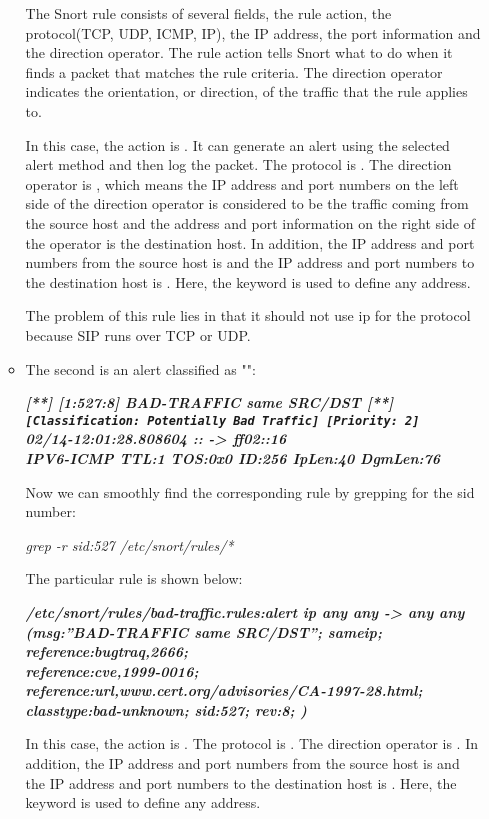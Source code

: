 \begin{enumerate}
\begin{itemize}
The Snort rule consists of several fields, the rule action, the protocol(TCP, UDP, ICMP, IP), the IP address, the port information and the direction operator. The rule action tells Snort what to do when it finds a packet that matches the rule criteria. The direction operator indicates the orientation, or direction, of the traffic that the rule applies to.

In this case, the action is . It can generate an alert using the selected alert method and then log the packet. The protocol is .  The direction operator is  \exploitname{->}, which means the IP address and port numbers on the left side of the direction operator is considered to be the traffic coming from the source host and the address and port information on the right side of the operator is the destination host. In addition, the IP address and port numbers from the source host is  and the IP address and port numbers to the destination host is . Here, the keyword  is used to define any address. 

The problem of this rule lies in that it should not use ip for the protocol because SIP runs over TCP or UDP.  
\item The second is an alert classified as "":

{\bfseries{\textit{[**] [1:527:8] BAD-TRAFFIC same SRC/DST [**]\\\lstinline{[Classification: Potentially Bad Traffic] [Priority: 2]}\\02/14-12:01:28.808604 :: -> ff02::16\\IPV6-ICMP TTL:1 TOS:0x0 ID:256 IpLen:40 DgmLen:76}}}

Now we can smoothly find the corresponding rule by grepping for the sid number:

\textit{grep -r sid:527 /etc/snort/rules/*}

The particular rule is shown below:

{\bfseries{\textit{/etc/snort/rules/bad-traffic.rules:alert ip any any -> any any\\(msg:”BAD-TRAFFIC same SRC/DST”; sameip; reference:bugtraq,2666; \\reference:cve,1999-0016; reference:url,www.cert.org/advisories/CA-1997-28.html;\\classtype:bad-unknown; sid:527; rev:8; )}}}

In this case, the action is . The protocol is .  The direction operator is  \exploitname{->}. In addition, the IP address and port numbers from the source host is  and the IP address and port numbers to the destination host is . Here, the keyword  is used to define any address. 


\end{itemize}
\end{enumerate}

